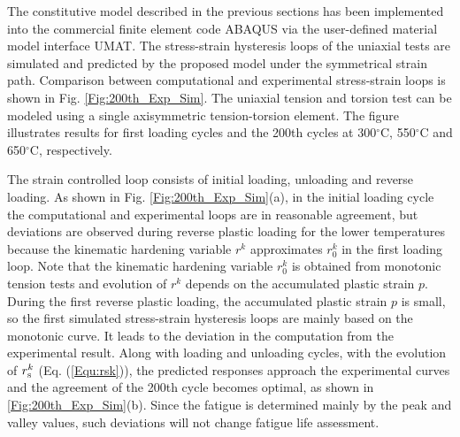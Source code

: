 \documentclass[preprint,5p,twocolumn,11pt,sort&compress]{elsarticle}
\begin{document}
\begin{figure*}
\caption{Comparison of the stress-strain hysteresis loops from experiments and computations  under isothermal uniaxial tensile loading conditions at 300$^{\circ}$C, 550$^{\circ}$C and 650$^{\circ}$C, respectively. (a) The first loading cycle. (b) The 200th. cycle.}
\label{Fig:200th_Exp_Sim}
\end{figure*}

\noindent
The constitutive model described in the previous sections has been implemented into the commercial finite element code  ABAQUS via the user-defined material model interface UMAT. 
The stress-strain hysteresis loops of the uniaxial tests are simulated and predicted by the proposed model under the symmetrical strain path.
Comparison between computational and experimental stress-strain loops is shown in Fig. \ref{Fig:200th_Exp_Sim}. The uniaxial tension and torsion test can be modeled using a single axisymmetric tension-torsion element.
The figure illustrates results for first loading cycles and the 200th cycles at 300$^{\circ}$C, 550$^{\circ}$C and 650$^{\circ}$C, respectively.

The strain controlled loop consists of initial loading, unloading and reverse loading.
As shown in Fig. \ref{Fig:200th_Exp_Sim}(a), in the initial loading cycle the computational and experimental loops are in reasonable agreement, but deviations are observed during reverse plastic loading for the lower temperatures because the kinematic hardening variable $r^k$ approximates ${r_0^k}$ in the first loading loop.
Note that the kinematic hardening variable ${r_0^k}$ is obtained from monotonic tension tests and evolution of $r^k$ depends on the accumulated plastic strain $p$.
During the first reverse plastic loading, the accumulated plastic strain $p$ is small, so the first simulated stress-strain hysteresis loops are mainly based on the monotonic curve. It leads to the deviation in the computation from the experimental result.
Along with loading and unloading cycles, with the evolution of $r_{\rm s}^k$ (Eq. (\ref{Equ:rsk})), the predicted responses approach the experimental curves and the agreement of the 200th cycle becomes optimal, as shown in \ref{Fig:200th_Exp_Sim}(b). Since the fatigue is determined mainly by the peak and valley values, such deviations will not change fatigue life assessment.
\end{document}
